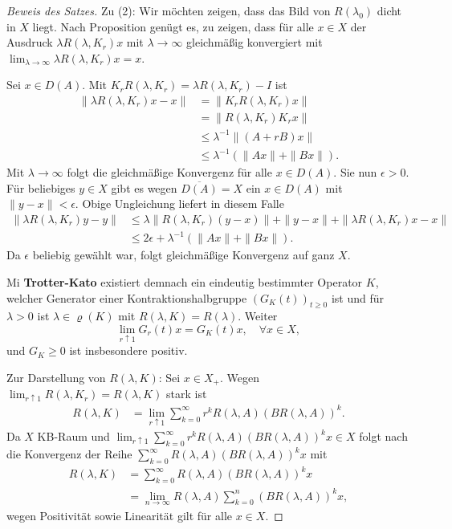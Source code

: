 \begin{proof}[Beweis des Satzes]
\par
Zu (2): Wir möchten zeigen, dass das Bild von $R(\lambda_0)$ dicht in $X$ liegt.  Nach Proposition  genügt es, zu zeigen, dass für alle $x\in X$ der Ausdruck $\lambda R(\lambda, K_r)x$ mit $\lambda\to\infty$ gleichmäßig konvergiert mit $\lim_{\lambda\to\infty}\lambda R(\lambda, K_r)x = x$. 

\par
Sei $x\in D(A)$. Mit $K_r R(\lambda, K_r)=\lambda R(\lambda, K_r)-I$ ist 
\begin{align*}
\|\lambda R(\lambda, K_r)x -x\|
&=\|K_r R(\lambda, K_r)x\|\\
&=\|R(\lambda, K_r)K_rx\|\\
&\leq \lambda^{-1}\|(A+rB)x\|\\
&\leq \lambda^{-1}(\|Ax\| + \|Bx\|).
\end{align*}
Mit $\lambda \to \infty$ folgt die gleichmäßige Konvergenz für alle $x\in D(A)$. Sie nun $\epsilon >0$. Für beliebiges $y\in X$ gibt es wegen $\overline{D(A)}= X$ ein $x\in D(A)$ mit $\|y - x\|< \epsilon$. Obige Ungleichung liefert in diesem Falle
\begin{align*}
\|\lambda R(\lambda, K_r)y - y\|
&\leq \lambda \|R(\lambda, K_r)(y-x)\| + \|y-x\| + \|\lambda R(\lambda, K_r)x -x\|\\
&\leq 2\epsilon + \lambda^{-1}(\|Ax\| + \|Bx\|).
\end{align*}
Da $\epsilon$ beliebig gewählt war, folgt gleichmäßige Konvergenz auf ganz $X$. 

\par
Mi \textbf{Trotter-Kato} existiert demnach ein eindeutig bestimmter Operator $K$, welcher Generator einer Kontraktionshalbgruppe $(G_K(t))_{t\geq0}$ ist und für $\lambda>0$ ist $\lambda\in\varrho(K)$ mit $R(\lambda, K)=R(\lambda)$. Weiter
\begin{equation*}
\lim_{r\uparrow 1} G_r(t)x = G_K(t)x, \quad \forall x\in X,
\end{equation*}
und $G_K\geq0$ ist insbesondere positiv.

\par
Zur Darstellung von $R(\lambda, K)$: Sei $x\in X_+$. Wegen $\lim_{r\uparrow 1}R(\lambda, K_r)=R(\lambda, K)$ stark ist
\begin{align*}
R(\lambda, K)
&=\lim_{r\uparrow 1}\sum_{k=0}^\infty r^k R(\lambda, A)(BR(\lambda, A))^k.
\end{align*}
Da $X$ KB-Raum und $\lim_{r\uparrow 1}\sum_{k=0}^\infty r^k R(\lambda, A)(BR(\lambda, A))^kx\in X$ folgt nach  die Konvergenz der Reihe $\sum_{k=0}^\infty R(\lambda, A)(BR(\lambda, A))^kx$ mit
\begin{align*}
R(\lambda, K)
&=\sum_{k=0}^\infty R(\lambda, A)(BR(\lambda, A))^kx\\
&= \lim_{n\to\infty } R(\lambda, A)\sum_{k=0}^n (BR(\lambda, A))^kx,
\end{align*}
wegen Positivität sowie Linearität gilt für alle $x\in X$.


\end{proof}
